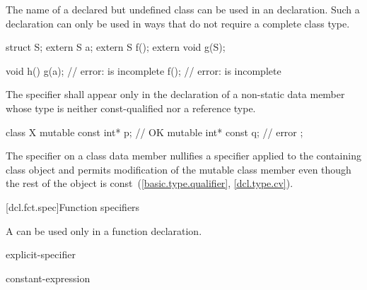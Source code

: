 \pnum
{}%
The name of a declared but undefined class can be used in an
 declaration. Such a declaration can only be used in ways
that do not require a complete class type.
\begin{example}
\begin{codeblock}
struct S;
extern S a;
extern S f();
extern void g(S);

void h() {
  g(a);                         // error:  is incomplete
  f();                          // error:  is incomplete
}
\end{codeblock}
\end{example}

\pnum
The  specifier shall appear only in the declaration of
a non-static data member
whose type is neither const-qualified nor a reference type.
\begin{example}
\begin{codeblock}
class X {
  mutable const int* p;         // OK
  mutable int* const q;         // error
};
\end{codeblock}
\end{example}

\pnum
\begin{note}
The  specifier on a class data member nullifies a
 specifier applied to the containing class object and
permits modification of the mutable class member even though the rest of
the object is const~(\ref{basic.type.qualifier}, \ref{dcl.type.cv}).
\end{note}

[dcl.fct.spec]{Function specifiers}%
%

\pnum
A
can be used only in a function declaration.

\begin{bnf}
\br
    \br
    explicit-specifier
\end{bnf}

\begin{bnf}
\br
     \terminal{(} constant-expression \terminal{)}\br
\end{bnf}

